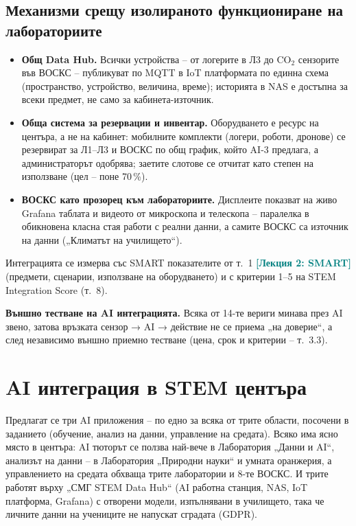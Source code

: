 \documentclass[11pt,a4paper]{article}
\newcommand{\lecturetag}[1]{\textcolor{teal}{\small\bfseries[#1]}}
\begin{document}
\subsection{Механизми срещу изолираното функциониране на лабораториите}

\begin{itemize}
\item \textbf{Общ Data Hub.} Всички устройства – от логерите в Л3 до CO$_2$ сензорите във ВОСКС – публикуват по MQTT в IoT платформата по единна схема (пространство, устройство, величина, време); историята в NAS е достъпна за всеки предмет, не само за кабинета-източник.
\item \textbf{Обща система за резервации и инвентар.} Оборудването е ресурс на центъра, а не на кабинет: мобилните комплекти (логери, роботи, дронове) се резервират за Л1–Л3 и ВОСКС по общ график, който AI-3 предлага, а администраторът одобрява; заетите слотове се отчитат като степен на използване (цел – поне 70\,\%).
\item \textbf{ВОСКС като прозорец към лабораториите.} Дисплеите показват на живо Grafana таблата и видеото от микроскопа и телескопа – паралелка в обикновена класна стая работи с реални данни, а самите ВОСКС са източник на данни („Климатът на училището“).
\end{itemize}
Интеграцията се измерва със SMART показателите от т.~1 \lecturetag{Лекция 2: SMART} (предмети, сценарии, използване на оборудването) и с критерии 1–5 на STEM Integration Score (т.~8).

\textbf{Външно тестване на AI интеграцията.} Всяка от 14-те вериги минава през AI звено, затова връзката сензор → AI → действие не се приема „на доверие“, а след независимо външно приемно тестване (цена, срок и критерии – т.~3.3).

\clearpage%
\section{AI интеграция в STEM центъра}

Предлагат се три AI приложения – по едно за всяка от трите области, посочени в заданието (обучение, анализ на данни, управление на средата). Всяко има ясно място в центъра: AI тюторът се ползва най-вече в Лаборатория „Данни и AI“, анализът на данни – в Лаборатория „Природни науки“ и умната оранжерия, а управлението на средата обхваща трите лаборатории и 8-те ВОСКС. И трите работят върху „СМГ STEM Data Hub“ (AI работна станция, NAS, IoT платформа, Grafana) с отворени модели, изпълнявани в училището, така че личните данни на учениците не напускат сградата (GDPR).
\end{document}
